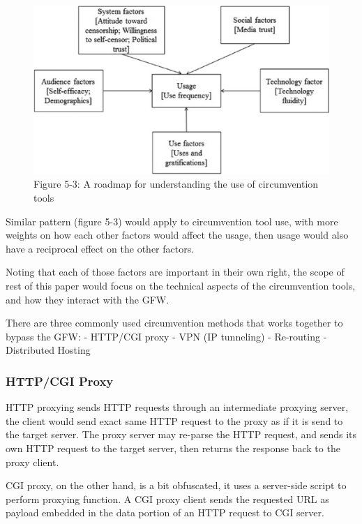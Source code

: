 \documentclass[sigconf]{acmart}
\begin{document}
\begin{figure}
\centering
\includegraphics{./res/5.3-circumventAdopt.png}
\caption{Figure 5-3: A roadmap for understanding the use of
circumvention tools}
\end{figure}

Similar pattern (figure 5-3) \cite{47_circumvention} would apply to
circumvention tool use, with more weights on how each other factors
would affect the usage, then usage would also have a reciprocal effect
on the other factors.

Noting that each of those factors are important in their own right, the
scope of rest of this paper would focus on the technical aspects of the
circumvention tools, and how they interact with the GFW.

There are three commonly used circumvention methods that works together
to bypass the GFW: \cite{07_taxonomy} - HTTP/CGI proxy - VPN (IP
tunneling) - Re-routing - Distributed Hosting

\hypertarget{httpcgi-proxy}{%
\subsubsection{HTTP/CGI Proxy}\label{httpcgi-proxy}}

HTTP proxying sends HTTP requests through an intermediate proxying
server, the client would send exact same HTTP request to the proxy as if
it is send to the target server. The proxy server may re-parse the HTTP
request, and sends its own HTTP request to the target server, then
returns the response back to the proxy client.

CGI proxy, on the other hand, is a bit obfuscated, it uses a server-side
script to perform proxying function. A CGI proxy client sends the
requested URL as payload embedded in the data portion of an HTTP request
to CGI server.
\end{document}
